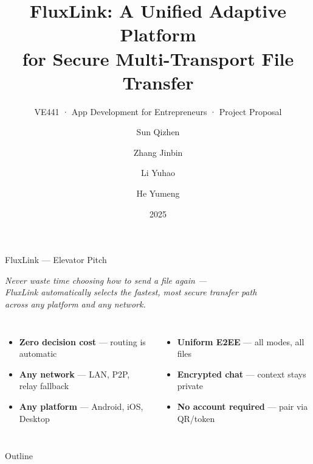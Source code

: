 \documentclass[xcolor=table,dvipsnames,svgnames,aspectratio=169]{beamer}
\title[FluxLink · Project Proposal]%
  {\textbf{FluxLink}: A Unified Adaptive Platform\\for Secure Multi-Transport File Transfer}
\subtitle{VE441 · App Development for Entrepreneurs · Project Proposal}
\author{Sun Qizhen \and Zhang Jinbin \and Li Yuhao \and He Yumeng}
\institute[UM-SJTU JI]{UM-SJTU Joint Institute · Shanghai Jiao Tong University}
\date{2025}
\begin{document}
\maketitle

\begin{frame}{FluxLink --- Elevator Pitch}
  \begin{block}{}
    \centering\large\itshape
    Never waste time choosing how to send a file again ---\\
    FluxLink automatically selects the fastest, most secure transfer path\\
    across any platform and any network.
  \end{block}

  \vspace{1.5em}

  \begin{columns}[c]
    \begin{itemize}
      \item \textbf{Zero decision cost} --- routing is automatic
      \item \textbf{Any network} --- LAN, P2P, relay fallback
      \item \textbf{Any platform} --- Android, iOS, Desktop
    \end{itemize}
    \begin{itemize}
      \item \textbf{Uniform E2EE} --- all modes, all files
      \item \textbf{Encrypted chat} --- context stays private
      \item \textbf{No account required} --- pair via QR/token
    \end{itemize}
  \end{columns}
\end{frame}

\begin{frame}{Outline}
  \tableofcontents[hideallsubsections]
\end{frame}

\AtBeginSection[]{
  \begin{frame}
    \tableofcontents[currentsection,subsectionstyle=show/show/hide]
  \end{frame}
}
\end{document}
